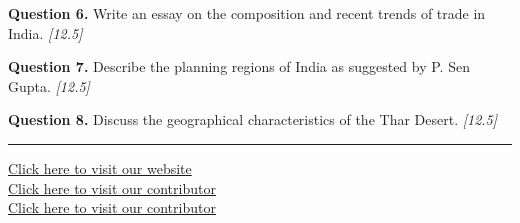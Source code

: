 \documentclass[11pt,a4paper]{article}
\newcommand{\pts}[1]{\hfill   \textit{[#1]}}
\begin{document}
\medskip


\noindent   \textbf{Question 6.} Write an essay on the composition and recent trends of trade in India. \pts{12.5}

\medskip


\noindent   \textbf{Question 7.} Describe the planning regions of India as suggested by P. Sen Gupta. \pts{12.5}

\medskip


\noindent   \textbf{Question 8.} Discuss the geographical characteristics of the Thar Desert. \pts{12.5}

\vfill\rule{\linewidth}{0.4pt}

\begin{center}\small
\href{https://bhu-exam.vercel.app/}{Click here to visit our website}\\[4pt]
\href{https://me-aryan.vercel.app/}{Click here to visit our contributor}\\[4pt]
\href{https://quashan-me.vercel.app/}{Click here to visit our contributor}
\end{center}
\end{document}
